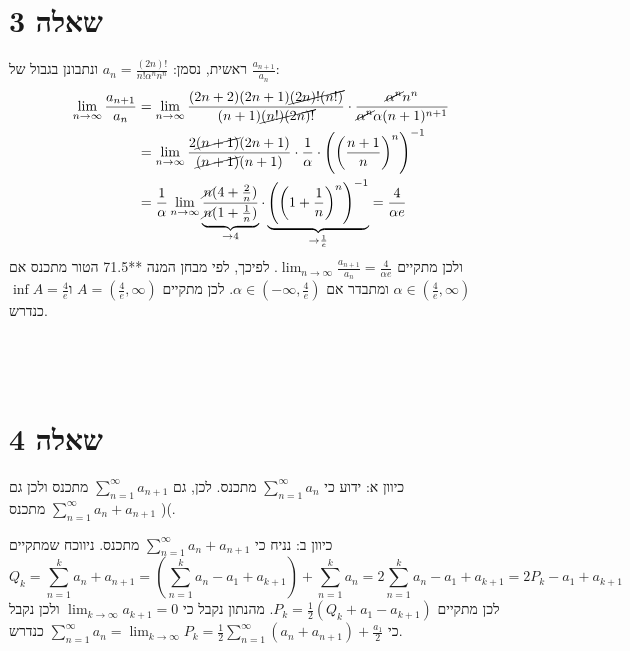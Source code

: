 \documentclass[11pt, oneside]{article}
\newcommand{\qed}{\R{$\blacksquare$}}
\newcommand{\br}{\\\\\\\\}
\newcommand{\m}[3]{\R{משפט #3#2.#1}}
\begin{document}
\section*{שאלה 3}
ראשית, נסמן: $a_{n} = \frac{(2n)!}{n!\alpha^{n}n^{n}}$ ונתבונן בגבול של $\frac{a_{n + 1}}{a_{n}}$:
\begin{align*}
\lim_{n \to \infty} \frac{a_{n + 1}}{a_{n}}
&= \lim_{n \to \infty} \frac{(2n + 2)(2n + 1)\cancel{(2n)!(n!)}}{(n + 1)\cancel{(n!)(2n)!}} \cdot \frac{\cancel{\alpha^{n}}n^{n}}{\cancel{\alpha^{n}}\alpha(n + 1)^{n + 1}}\\
&= \lim_{n \to \infty} \frac{2\cancel{(n + 1)}(2n + 1)}{\cancel{(n + 1)}(n + 1)} \cdot \frac{1}{\alpha} \cdot \left(\left(\frac{n + 1}{n}\right)^{n}\right)^{-1}\\
&= \frac{1}{\alpha} \lim_{n \to \infty} \underbrace{\frac{\cancel{n}(4 + \frac{2}{n})}{\cancel{n}(1 + \frac{1}{n})}}_{\to 4} \cdot \underbrace{\left(\left(1 + \frac{1}{n}\right)^{n}\right)^{-1}}_{\to \frac{1}{e}} = \frac{4}{\alpha e}
\end{align*}
ולכן מתקיים $\lim_{n \to \infty} \frac{a_{n + 1}}{a_{n}} = \frac{4}{\alpha e}$. לפיכך, לפי מבחן המנה **71.5 הטור מתכנס אם $\alpha \in (\frac{4}{e}, \infty)$ ומתבדר אם $\alpha \in (-\infty, \frac{4}{e})$. לכן מתקיים $A = (\frac{4}{e}, \infty)$ ו$\inf{A} = \frac{4}{e}$ כנדרש.
\br\qed

\section*{שאלה 4}
כיוון א: ידוע כי $\sum^{\infty}_{n = 1} a_{n}$ מתכנס. לכן, גם $\sum^{\infty}_{n = 1} a_{n + 1}$ מתכנס ולכן גם $\sum^{\infty}_{n = 1} a_{n} + a_{n + 1}$ מתכנס )\m{5}{9}{}(.

כיוון ב: נניח כי $\sum^{\infty}_{n = 1} a_{n} + a_{n + 1}$ מתכנס. ניווכח שמתקיים
\[
Q_{k} = \sum^{k}_{n = 1} a_{n} + a_{n + 1}
= \left(\sum^{k}_{n = 1} a_{n} - a_{1} + a_{k + 1}\right) + \sum^{k}_{n = 1} a_{n}
= 2\sum^{k}_{n = 1} a_{n} - a_{1} + a_{k + 1} = 2P_{k} - a_{1} + a_{k + 1}
\]
לכן מתקיים $P_{k} = \frac{1}{2}(Q_{k} + a_{1} - a_{k + 1})$. מהנתון נקבל כי $\lim_{k \to \infty} a_{k + 1} = 0$ ולכן נקבל כי $\sum^{\infty}_{n = 1} a_{n} = \lim_{k \to \infty} P_{k} = \frac{1}{2}\sum^{\infty}_{n = 1}(a_{n} + a_{n + 1}) + \frac{a_{1}}{2}$ כנדרש.
\qed
\clearpage

\end{document}
